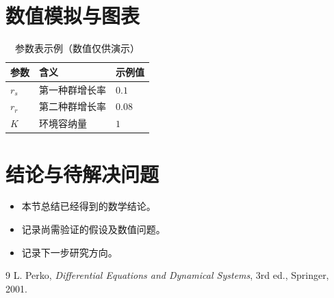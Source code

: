 \documentclass[12pt,a4paper]{ctexart}
\theoremstyle{plain}
\theoremstyle{definition}
\theoremstyle{remark}
\begin{document}
\section{数值模拟与图表}
\begin{table}[htbp]
\centering
\caption{参数表示例（数值仅供演示）}
\begin{tabular}{lll}
\toprule
参数 & 含义 & 示例值\\
\midrule
$r_s$ & 第一种群增长率 & $0.1$\\
$r_r$ & 第二种群增长率 & $0.08$\\
$K$ & 环境容纳量 & $1$\\
\bottomrule
\end{tabular}
\end{table}


\section{结论与待解决问题}
\begin{itemize}
    \item 本节总结已经得到的数学结论。
    \item 记录尚需验证的假设及数值问题。
    \item 记录下一步研究方向。
\end{itemize}

\begin{thebibliography}{9}
L. Perko, \textit{Differential Equations and Dynamical Systems}, 3rd ed., Springer, 2001.
\end{thebibliography}
\end{document}
